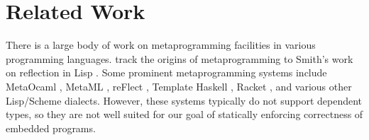 \documentclass[sigplan,screen,anonymous,review]{acmart}
\begin{document}
%






\section{\label{sec:related}Related Work}

There is a large body of
work on metaprogramming facilities in various programming
languages.  \citet{refl-masses} track the origins
of metaprogramming to Smith's work on reflection in Lisp \cite{refl-lisp}.
Some prominent metaprogramming systems include
MetaOcaml \cite{metaocaml}, Me\-taML \cite{metaml},
reFlect \cite{DBLP:journals/jfp/GrundyMO06},
Template Haskell \cite{sheard2002template},
Racket \cite{plt-tr1}, and various other Lisp/Scheme dialects.
%
However, these systems typically do not support dependent
types, so they are not well suited for our goal of statically
enforcing correctness of embedded programs.
\end{document}
